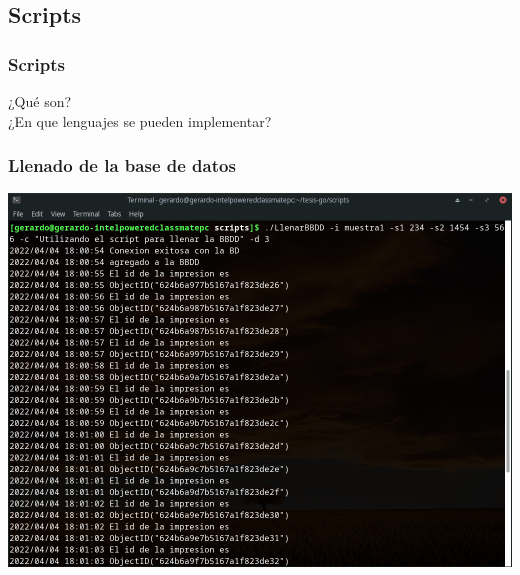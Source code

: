 \documentclass{beamer}
\begin{document}
\begin{frame}
\begin{table}
    \end{table}
\end{frame}

\subsection{Scripts}
\begin{frame}
    \frametitle{Scripts}
    \large
    ¿Qué son?\\ \pause
    \vfill
    ¿En que lenguajes se pueden implementar?
\end{frame}

\begin{frame}
    \frametitle{Llenado de la base de datos}
    \begin{table}
        \includegraphics[width=0.9\linewidth]{../images/diapositivas/scriptLlenarBBDD.png}
    \end{table}
\end{frame}
\end{document}
